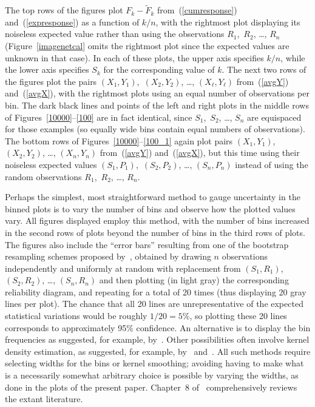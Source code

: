 \documentclass{article}
\begin{document}
The top rows of the figures plot $F_k-\tilde{F}_k$
from~(\ref{cumresponse}) and~(\ref{expresponse}) as a function of $k/n$,
with the rightmost plot displaying its noiseless expected value
rather than using the observations $R_1$,~$R_2$, \dots, $R_n$
(Figure~\ref{imagenetcal} omits the rightmost plot since the expected values
are unknown in that case).
In each of these plots,
the upper axis specifies $k/n$, while the lower axis specifies $S_k$
for the corresponding value of $k$.
The next two rows of the figures plot the pairs
$(X_1, Y_1)$,~$(X_2, Y_2)$, \dots, $(X_{\ell}, Y_{\ell})$
from~(\ref{avgY}) and~(\ref{avgX}),
with the rightmost plots using an equal number of observations per bin.
The dark black lines and points of the left and right plots in the middle rows
of Figures~\ref{10000}--\ref{100} are in fact identical,
since $S_1$,~$S_2$, \dots, $S_n$ are equispaced
for those examples (so equally wide bins contain equal numbers
of observations). The bottom rows of Figures~\ref{10000}--\ref{100_1}
again plot pairs $(X_1, Y_1)$,~$(X_2, Y_2)$, \dots, $(X_n, Y_n)$
from~(\ref{avgY}) and~(\ref{avgX}),
but this time using their noiseless expected values
$(S_1, P_1)$,~$(S_2, P_2)$, \dots, $(S_n, P_n)$
instead of using the random observations $R_1$,~$R_2$, \dots, $R_n$.

Perhaps the simplest, most straightforward method to gauge uncertainty
in the binned plots is to vary the number of bins
and observe how the plotted values vary.
All figures displayed employ this method, with the number of bins increased in
the second rows of plots beyond the number of bins in the third rows of plots.
The figures also include the ``error bars'' resulting
from one of the bootstrap resampling schemes proposed by~\cite{brocker-smith},
obtained by drawing $n$ observations independently and uniformly at random
with replacement from $(S_1, R_1)$, $(S_2, R_2)$, \dots, $(S_n, R_n)$
and then plotting (in light gray) the corresponding reliability diagram,
and repeating for a total of 20 times (thus displaying 20 gray lines per plot).
The chance that all 20 lines are unrepresentative
of the expected statistical variations would be roughly $1/20 = 5$\%,
so plotting these 20 lines corresponds to approximately 95\% confidence.
An alternative is to display the bin frequencies as suggested,
for example, by~\cite{murphy-winkler}.
Other possibilities often involve kernel density estimation,
as suggested, for example, by~\cite{brocker} and~\cite{wilks}.
All such methods require selecting widths for the bins or kernel smoothing;
avoiding having to make what is a necessarily somewhat arbitrary choice
is possible by varying the widths, as done in the plots of the present paper.
Chapter~8 of~\cite{wilks} comprehensively reviews the extant literature.
\end{document}
